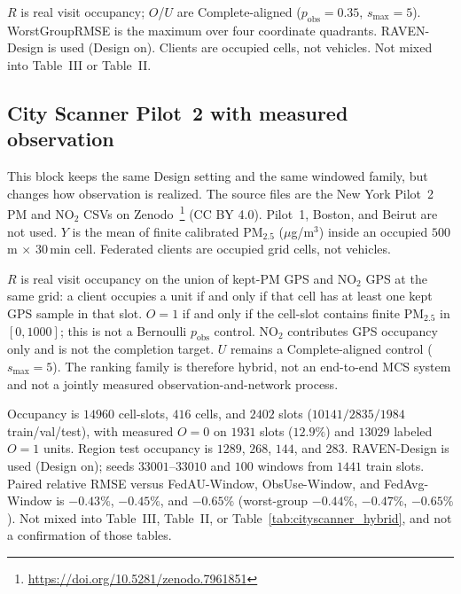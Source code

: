 \begin{table}[t]
\begin{minipage}{\columnwidth}
\raggedright\scriptsize
$R$ is real visit occupancy; $O$/$U$ are Complete-aligned
($p_{\mathrm{obs}}=0.35$, $s_{\max}=5$).
WorstGroupRMSE is the maximum over four coordinate quadrants.
RAVEN-Design is used (Design on).
Clients are occupied cells, not vehicles.
Not mixed into Table~III or
Table~II.
\end{minipage}
\end{table}

\subsection{City Scanner Pilot~2 with measured observation}
\label{app:cityscanner_p2_measured_o}

This block keeps the same Design setting and the same windowed family, but
changes how observation is realized.
The source files are the New York Pilot~2 {PM} and {NO}$_2$ CSVs on
Zenodo~\footnote{\url{https://doi.org/10.5281/zenodo.7961851}}
({CC BY} 4.0).  Pilot~1, Boston, and Beirut are not used.
$Y$ is the mean of finite calibrated {PM}$_{2.5}$ ($\mu$g/m$^3$) inside
an occupied $500$\,m $\times$ $30$\,min cell.
Federated clients are occupied grid cells, not vehicles.

$R$ is real visit occupancy on the union of kept-{PM} GPS and {NO}$_2$ GPS
at the same grid: a client occupies a unit if and only if that cell has at
least one kept GPS sample in that slot.
$O=1$ if and only if the cell-slot contains finite {PM}$_{2.5}$ in
$[0,1000]$; this is not a Bernoulli $p_{\mathrm{obs}}$ control.
{NO}$_2$ contributes GPS occupancy only and is not the completion target.
$U$ remains a Complete-aligned control ($s_{\max}=5$).
The ranking family is therefore hybrid, not an end-to-end MCS system and
not a jointly measured observation-and-network process.

Occupancy is $14960$ cell-slots, $416$ cells, and $2402$ slots
($10141/2835/1984$ train/val/test), with measured $O=0$ on $1931$ slots
($12.9\%$) and $13029$ labeled $O=1$ units.
Region test occupancy is $1289$, $268$, $144$, and $283$.
RAVEN-Design is used (Design on); seeds $33001$--$33010$ and
$100$ windows from $1441$ train slots.
Paired relative RMSE versus FedAU-Window, ObsUse-Window, and FedAvg-Window is
$-0.43\%$, $-0.45\%$, and $-0.65\%$ (worst-group $-0.44\%$, $-0.47\%$,
$-0.65\%$).
Not mixed into Table~III,
Table~II, or Table~\ref{tab:cityscanner_hybrid},
and not a confirmation of those tables.

